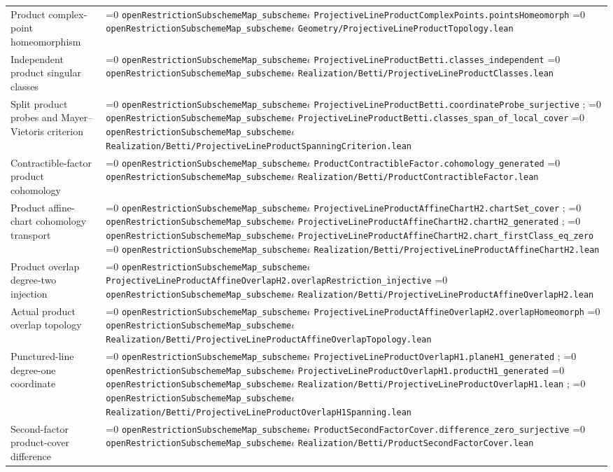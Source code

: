 \documentclass[11pt]{article}
\theoremstyle{definition}
\theoremstyle{remark}
\newcommand{\leanpath}[1]{%
  \ifnum\pdfstrcmp{\detokenize{#1}}%
      {\detokenize{openRestrictionSubschemeMap_subschemeι}}=0
    \texttt{\nolinkurl{openRestrictionSubschemeMap_subscheme}}\ensuremath{\iota}%
  \else
    \texttt{\nolinkurl{#1}}%
  \fi}
\begin{document}
\begin{longtable}{@{}>{\raggedright\arraybackslash}p{}
                >{\raggedright\arraybackslash}p{}@{}}
Product complex-point homeomorphism &
\leanpath{ProjectiveLineProductComplexPoints.pointsHomeomorph}\newline
\leanpath{Geometry/ProjectiveLineProductTopology.lean}\\
Independent product singular classes &
\leanpath{ProjectiveLineProductBetti.classes_independent}\newline
\leanpath{Realization/Betti/ProjectiveLineProductClasses.lean}\\
Split product probes and Mayer--Vietoris criterion &
\leanpath{ProjectiveLineProductBetti.coordinateProbe_surjective};
\leanpath{ProjectiveLineProductBetti.classes_span_of_local_cover}\newline
\leanpath{Realization/Betti/ProjectiveLineProductSpanningCriterion.lean}\\
Contractible-factor product cohomology &
\leanpath{ProductContractibleFactor.cohomology_generated}\newline
\leanpath{Realization/Betti/ProductContractibleFactor.lean}\\
Product affine-chart cohomology transport &
\leanpath{ProjectiveLineProductAffineChartH2.chartSet_cover};
\leanpath{ProjectiveLineProductAffineChartH2.chartH2_generated};
\leanpath{ProjectiveLineProductAffineChartH2.chart_firstClass_eq_zero}\newline
\leanpath{Realization/Betti/ProjectiveLineProductAffineChartH2.lean}\\
Product overlap degree-two injection &
\leanpath{ProjectiveLineProductAffineOverlapH2.overlapRestriction_injective}\newline
\leanpath{Realization/Betti/ProjectiveLineProductAffineOverlapH2.lean}\\
Actual product overlap topology &
\leanpath{ProjectiveLineProductAffineOverlapH2.overlapHomeomorph}\newline
\leanpath{Realization/Betti/ProjectiveLineProductAffineOverlapTopology.lean}\\
Punctured-line degree-one coordinate &
\leanpath{ProjectiveLineProductOverlapH1.planeH1_generated};
\leanpath{ProjectiveLineProductOverlapH1.productH1_generated}\newline
\leanpath{Realization/Betti/ProjectiveLineProductOverlapH1.lean};
\leanpath{Realization/Betti/ProjectiveLineProductOverlapH1Spanning.lean}\\
Second-factor product-cover difference &
\leanpath{ProductSecondFactorCover.difference_zero_surjective}\newline
\leanpath{Realization/Betti/ProductSecondFactorCover.lean}\\

\end{longtable}
\end{document}
